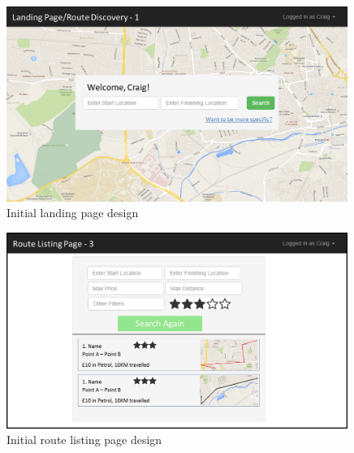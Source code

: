 \documentclass[a4paper,twoside,notitlepage,11pt]{article}
\begin{document}
\begin{figure}[!ht]
	\begin{center}
			\includegraphics[width=0.99\textwidth]{images/ui-landing-1.png}
	\end{center}
	\vspace{-6mm}
	\caption{Initial landing page design}
\end{figure}
\newpage 
\begin{figure}[!ht]
	\begin{center}
			\includegraphics[width=0.99\textwidth]{images/ui-rlp-3.png}
	\end{center}
	\vspace{-6mm}
	\caption{Initial route listing page design}
\end{figure}
\end{document}
